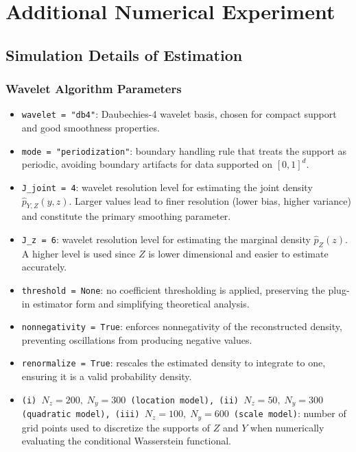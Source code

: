 \documentclass{article}
\theoremstyle{plain}
\theoremstyle{definition}
\theoremstyle{plain}
\begin{document}
\section{Additional Numerical Experiment}\label{appe:sec:numerical.experiment}

\subsection{Simulation Details of Estimation}

\subsubsection{Wavelet Algorithm Parameters}

\begin{itemize}
    \item \texttt{wavelet = "db4"}: Daubechies-4 wavelet basis, chosen for compact support and good smoothness properties.

    \item \texttt{mode = "periodization"}: boundary handling rule that treats the support as periodic, avoiding boundary artifacts for data supported on $[0,1]^d$.

    \item \texttt{J\_joint = 4}: wavelet resolution level for estimating the joint density $\widehat p_{Y,Z}(y,z)$. 
    Larger values lead to finer resolution (lower bias, higher variance) and constitute the primary smoothing parameter.

    \item \texttt{J\_z = 6}: wavelet resolution level for estimating the marginal density $\widehat p_Z(z)$. 
    A higher level is used since $Z$ is lower dimensional and easier to estimate accurately.
    
    \item \texttt{threshold = None}: no coefficient thresholding is applied, preserving the plug-in estimator form and simplifying theoretical analysis.

    \item \texttt{nonnegativity = True}: enforces nonnegativity of the reconstructed density, preventing oscillations from producing negative values.

    \item \texttt{renormalize = True}: rescales the estimated density to integrate to one, ensuring it is a valid probability density.

     \item \texttt{(i) $N_z = 200,\; N_y = 300$ (location model), (ii) $N_z = 50,\; N_y = 300$ (quadratic model), (iii) $N_z = 100,\; N_y = 600$ (scale model)}: number of grid points used to discretize the supports of $Z$ and $Y$ when numerically evaluating the conditional Wasserstein functional.
\end{itemize}
\end{document}
